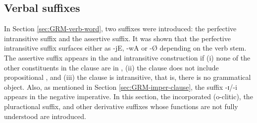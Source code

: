 \begin{exe}
\begin{exe}
\begin{exe}
\begin{exe}
\begin{exe}
\begin{exe}
\begin{exe}
\begin{exe}
\begin{exe}
\begin{exe}
\begin{exe}
\begin{exe}



\subsection{Verbal suffixes}
\label{sec:GRM-verb-suffix}

In Section \ref{sec:GRM-verb-word}, two suffixes were introduced: the perfective intransitive suffix and the assertive suffix. It was shown that the perfective intransitive suffix surfaces either as {\sls -jE}, {\sls -wA} or {\sls  -\O} depending on  the verb stem.  The assertive suffix appears  in the  and   intransitive construction if  (i) none of the other constituents in the clause are in , (ii) the clause does not include propositional , and (iii) the clause is intransitive, that is, there is no grammatical object. Also,  as mentioned in Section \ref{sec:GRM-imper-clause},  the suffix {\sls -ɪ}/{\sls -i} appears in the negative imperative. In this section,  the incorporated   ({\sc o}-clitic), the pluractional  suffix, and  other derivative suffixes whose functions are not fully understood are introduced.


\end{exe}
\end{exe}
\end{exe}
\end{exe}
\end{exe}
\end{exe}
\end{exe}
\end{exe}
\end{exe}
\end{exe}
\end{exe}
\end{exe}
